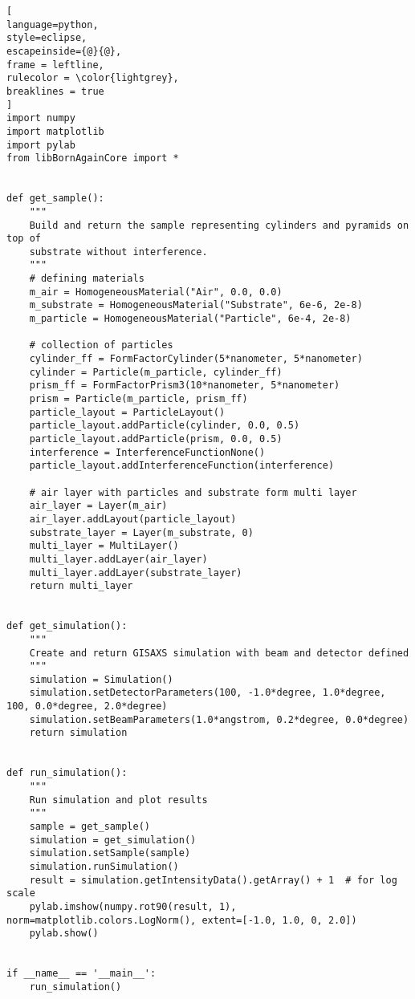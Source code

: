 \begin{lstlisting}[
language=python, 
style=eclipse, 
escapeinside={@}{@},
frame = leftline, 
rulecolor = \color{lightgrey},
breaklines = true
]
import numpy
import matplotlib
import pylab
from libBornAgainCore import *


def get_sample():
    """
    Build and return the sample representing cylinders and pyramids on top of
    substrate without interference.
    """
    # defining materials
    m_air = HomogeneousMaterial("Air", 0.0, 0.0)
    m_substrate = HomogeneousMaterial("Substrate", 6e-6, 2e-8)
    m_particle = HomogeneousMaterial("Particle", 6e-4, 2e-8)

    # collection of particles
    cylinder_ff = FormFactorCylinder(5*nanometer, 5*nanometer)
    cylinder = Particle(m_particle, cylinder_ff)
    prism_ff = FormFactorPrism3(10*nanometer, 5*nanometer)
    prism = Particle(m_particle, prism_ff)
    particle_layout = ParticleLayout()
    particle_layout.addParticle(cylinder, 0.0, 0.5)
    particle_layout.addParticle(prism, 0.0, 0.5)
    interference = InterferenceFunctionNone()
    particle_layout.addInterferenceFunction(interference)

    # air layer with particles and substrate form multi layer
    air_layer = Layer(m_air)
    air_layer.addLayout(particle_layout)
    substrate_layer = Layer(m_substrate, 0)
    multi_layer = MultiLayer()
    multi_layer.addLayer(air_layer)
    multi_layer.addLayer(substrate_layer)
    return multi_layer


def get_simulation():
    """
    Create and return GISAXS simulation with beam and detector defined
    """
    simulation = Simulation()
    simulation.setDetectorParameters(100, -1.0*degree, 1.0*degree, 100, 0.0*degree, 2.0*degree)
    simulation.setBeamParameters(1.0*angstrom, 0.2*degree, 0.0*degree)
    return simulation


def run_simulation():
    """
    Run simulation and plot results
    """
    sample = get_sample()
    simulation = get_simulation()
    simulation.setSample(sample)
    simulation.runSimulation()
    result = simulation.getIntensityData().getArray() + 1  # for log scale
    pylab.imshow(numpy.rot90(result, 1), norm=matplotlib.colors.LogNorm(), extent=[-1.0, 1.0, 0, 2.0])
    pylab.show()


if __name__ == '__main__':
    run_simulation()

\end{lstlisting}


%
\newpage
